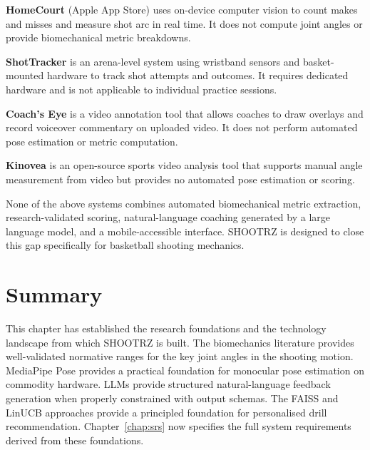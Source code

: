 \textbf{HomeCourt} (Apple App Store) uses on-device computer vision to count makes and misses and measure shot arc in real time. It does not compute joint angles or provide biomechanical metric breakdowns.

\textbf{ShotTracker} is an arena-level system using wristband sensors and basket-mounted hardware to track shot attempts and outcomes. It requires dedicated hardware and is not applicable to individual practice sessions.

\textbf{Coach's Eye} is a video annotation tool that allows coaches to draw overlays and record voiceover commentary on uploaded video. It does not perform automated pose estimation or metric computation.

\textbf{Kinovea} is an open-source sports video analysis tool that supports manual angle measurement from video but provides no automated pose estimation or scoring.

None of the above systems combines automated biomechanical metric extraction, research-validated scoring, natural-language coaching generated by a large language model, and a mobile-accessible interface. SHOOTRZ is designed to close this gap specifically for basketball shooting mechanics.

\section{Summary}
\label{sec:background_summary}

This chapter has established the research foundations and the technology landscape from which SHOOTRZ is built. The biomechanics literature provides well-validated normative ranges for the key joint angles in the shooting motion. MediaPipe Pose provides a practical foundation for monocular pose estimation on commodity hardware. LLMs provide structured natural-language feedback generation when properly constrained with output schemas. The FAISS and LinUCB approaches provide a principled foundation for personalised drill recommendation. Chapter~\ref{chap:srs} now specifies the full system requirements derived from these foundations.
